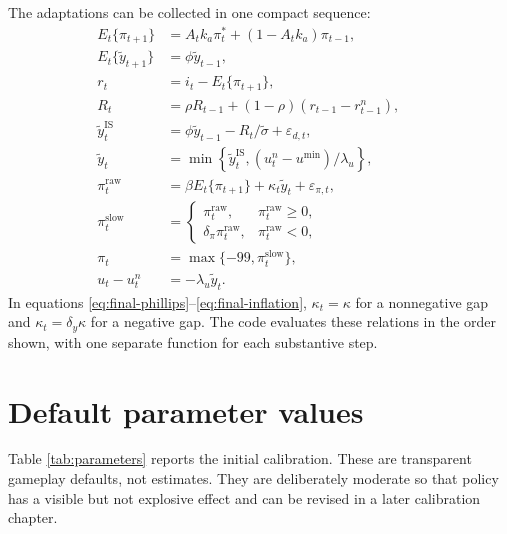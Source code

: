 \documentclass[11pt]{article}
\newcommand{\gap}{\widetilde y}
\newcommand{\pistar}{\pi^{*}}
\begin{document}
The adaptations can be collected in one compact sequence:
\begin{align}
 E_t\{\pi_{t+1}\}&=A_tk_a\pistar_t+(1-A_tk_a)\pi_{t-1},
 &&\label{eq:final-inflation-expectation}\\
 E_t\{\gap_{t+1}\}&=\phi\gap_{t-1},
 &&\label{eq:final-gap-expectation}\\
 r_t&=i_t-E_t\{\pi_{t+1}\},
 &&\label{eq:final-real-rate}\\
 R_t&=\rho R_{t-1}+(1-\rho)(r_{t-1}-r^n_{t-1}),
 &&\label{eq:final-rate-stock}\\
 \gap_t^{\mathrm{IS}}&=\phi\gap_{t-1}-R_t/\widetilde\sigma
 +\varepsilon_{d,t},
 &&\label{eq:final-is}\\
 \gap_t&=\min\!\left\{\gap_t^{\mathrm{IS}},
 (u_t^n-u^{\min})/\lambda_u\right\},
 &&\label{eq:final-capacity}\\
 \pi_t^{\mathrm{raw}}&=\beta E_t\{\pi_{t+1}\}
 +\kappa_t\gap_t+\varepsilon_{\pi,t},
 &&\label{eq:final-phillips}\\
 \pi_t^{\mathrm{slow}}&=
 \begin{cases}
 \pi_t^{\mathrm{raw}},&\pi_t^{\mathrm{raw}}\geq0,\\
 \delta_\pi\pi_t^{\mathrm{raw}},&\pi_t^{\mathrm{raw}}<0,
 \end{cases}
 &&\label{eq:final-slow-inflation}\\
 \pi_t&=\max\{-99,\pi_t^{\mathrm{slow}}\},
 &&\label{eq:final-inflation}\\
 u_t-u_t^n&=-\lambda_u\gap_t.
 &&\label{eq:final-okun}
\end{align}
In equations \eqref{eq:final-phillips}--\eqref{eq:final-inflation},
$\kappa_t=\kappa$ for a nonnegative gap and
$\kappa_t=\delta_y\kappa$ for a negative gap.  The code evaluates these
relations in the order shown, with one separate function for each substantive
step.

\section{Default parameter values}

Table \ref{tab:parameters} reports the initial calibration.  These are
transparent gameplay defaults, not estimates.  They are deliberately moderate
so that policy has a visible but not explosive effect and can be revised in a
later calibration chapter.
\end{document}
